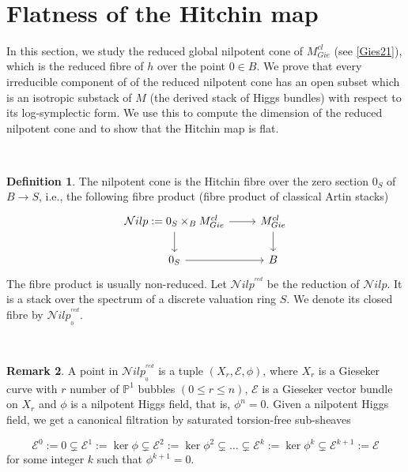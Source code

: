 \documentclass[11pt]{amsart}
\theoremstyle{plain}
\numberwithin{equation}{section}
\theoremstyle{definition}
\newtheorem{Def}{Definition}[section]
\newtheorem{Rem}[Def]{Remark}
\theoremstyle{plain}
\begin{document}
\

\section{\textbf{Flatness of the Hitchin map}}
In this section, we study the reduced global nilpotent cone of $M^{cl}_{Gie}$ (see \ref{Gies21}), which is the reduced  fibre of $h$ over the point $0\in B$. We prove that every irreducible component of of the reduced nilpotent cone has an open subset which is an isotropic substack of $M$ (the derived stack of Higgs bundles) with respect to its log-symplectic form. We use this to compute the dimension of the reduced nilpotent cone and to show that the Hitchin map is flat. 

\

\begin{Def}
The nilpotent cone is the Hitchin fibre over the zero section $0_S$ of $B\longrightarrow S$, i.e., the following fibre product (fibre product of classical Artin stacks)
\begin{equation}
\begin{tikzcd}
\mathcal Nilp:=0_S\times_{B} M^{cl}_{Gie} \arrow{r}\arrow{d} & M^{cl}_{Gie}\arrow{d}\\
0_S\arrow{r} & B 
\end{tikzcd}
\end{equation}
The fibre product is usually non-reduced. Let $\mathcal Nilp^{^{red}}$ be the reduction of $\mathcal Nilp$. It is a stack over the spectrum of a discrete valuation ring $S$. We denote its closed fibre by $\mathcal Nilp^{^{red}}_{_0}$.
\end{Def}

\

\begin{Rem}\label{Nilp12}
A point in $\mathcal Nilp^{^{red}}_{_0}$ is a tuple $(X_r, \mathcal E, \phi)$, where $X_r$ is a Gieseker curve with $r$ number of $\mathbb P^1$ bubbles $(0\leq r\leq n)$, $\mathcal E$ is a Gieseker vector bundle on $X_{r}$  and $\phi$ is a nilpotent Higgs field, that is, $\phi^n=0$. Given a nilpotent Higgs field, we get a canonical filtration by saturated torsion-free sub-sheaves 

\begin{equation}\label{fflag}
\mathcal E^0:=0\subsetneq \mathcal E^1:=\ker \phi\subsetneq \mathcal E^{2}:=\ker \phi^{2} \subsetneq \dots\subsetneq \mathcal E^k:=\ker \phi^k\subsetneq \mathcal E^{k+1}:=\mathcal E
\end{equation}
for some integer $k$ such that $\phi^{k+1}=0$. 

\end{Rem}
\end{document}
